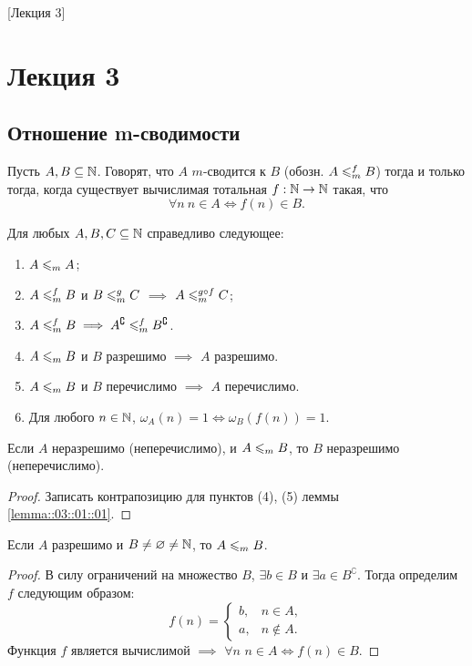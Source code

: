[Лекция 3]
\newpage

\section{Лекция 3}

\subsection{Отношение m-сводимости}

\begin{definition}
    Пусть $A, B \subseteq \mathbb{N}$.
    Говорят, что $A$ $m$-сводится к $B$ (обозн. $A \leqslant_{m}^{f} B$) тогда и только тогда, когда существует вычислимая тотальная $f: \mathbb{N} \to \mathbb{N}$ такая, что
    $$
        \forall n~ n \in A \iff f(n) \in B.
    $$
\end{definition}

\begin{lemma} \label{lemma::03::01::01}
    Для любых $A, B, C \subseteq \mathbb{N}$ справедливо следующее:
    \begin{enumerate}
        \item $A \leqslant_{m} A$;
        \item $A \leqslant_{m}^{f} B$ и $B \leqslant_{m}^{g} C$ $\implies$ $A \leqslant_{m}^{g \circ f} C$;
        \item $A \leqslant_{m}^{f} B \implies A^{\complement} \leqslant_{m}^{f} B^{\complement}$.
        \item $A \leqslant_{m} B$ и $B$ разрешимо $\implies$ $A$ разрешимо.
        \item $A \leqslant_{m} B$ и $B$ перечислимо $\implies$ $A$ перечислимо.
        \item Для любого $n \in \mathbb{N}$, $\omega_{A}\left(n\right) = 1 \iff \omega_{B}\left(f\left(n\right)\right) = 1$.
    \end{enumerate}
\end{lemma}

\begin{corollary}
    Если $A$ неразрешимо (неперечислимо), и $A \leqslant_{m} B$, то $B$ неразрешимо (неперечислимо).
\end{corollary}
\begin{proof}
    Записать контрапозицию для пунктов (4), (5) леммы \ref{lemma::03::01::01}.
\end{proof}

\begin{statement}
    Если $A$ разрешимо и $B \neq \varnothing \neq \mathbb{N}$, то $A \leqslant_{m} B$.
\end{statement}
\begin{proof}
    В силу ограничений на множество $B$, $\exists b \in B$ и $\exists a \in B^{\complement}$.
    Тогда определим $f$ следующим образом:
    $$
        f\left(n\right) = \begin{cases}
            b, & n \in A, \\
            a, & n \notin A.
        \end{cases}
    $$
    Функция $f$ является вычислимой $\implies$ $\forall n$ $n \in A \iff f(n) \in B$.
\end{proof}

